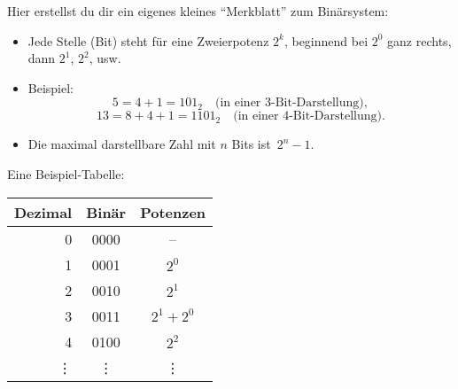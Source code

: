\documentclass[a4paper,12pt]{article}
\begin{document}
                                                  Hier erstellst du dir ein eigenes kleines ``Merkblatt'' zum Binärsystem:
                                                  \begin{itemize}
                                                   \item Jede Stelle (Bit) steht für eine Zweierpotenz \(2^k\), beginnend bei \(2^0\) ganz rechts, dann \(2^1\), \(2^2\), usw.
                                                    \item Beispiel:
                                                       \[
                                                            5 = 4 + 1 = 101_2 \quad\text{(in einer 3-Bit-Darstellung)},
                                                               \]
                                                                  \[
                                                                       13 = 8 + 4 + 1 = 1101_2 \quad\text{(in einer 4-Bit-Darstellung)}.
                                                                          \]
                                                                           \item Die maximal darstellbare Zahl mit \(n\) Bits ist \(\,2^n - 1\).
                                                                           \end{itemize}

                                                                           Eine Beispiel-Tabelle:

                                                                           \begin{center}
                                                                           \begin{tabular}{@{}rcc@{}}
                                                                           \toprule
                                                                           \textbf{Dezimal} & \textbf{Binär} & \textbf{Potenzen} \\
                                                                           \midrule
                                                                           0 & 0000 & -- \\
                                                                           1 & 0001 & \(2^0\) \\
                                                                           2 & 0010 & \(2^1\) \\
                                                                           3 & 0011 & \(2^1 + 2^0\) \\
                                                                           4 & 0100 & \(2^2\) \\
                                                                           \vdots & \vdots & \vdots \\
                                                                           \bottomrule
                                                                           \end{tabular}
                                                                           \end{center}
\end{document}

